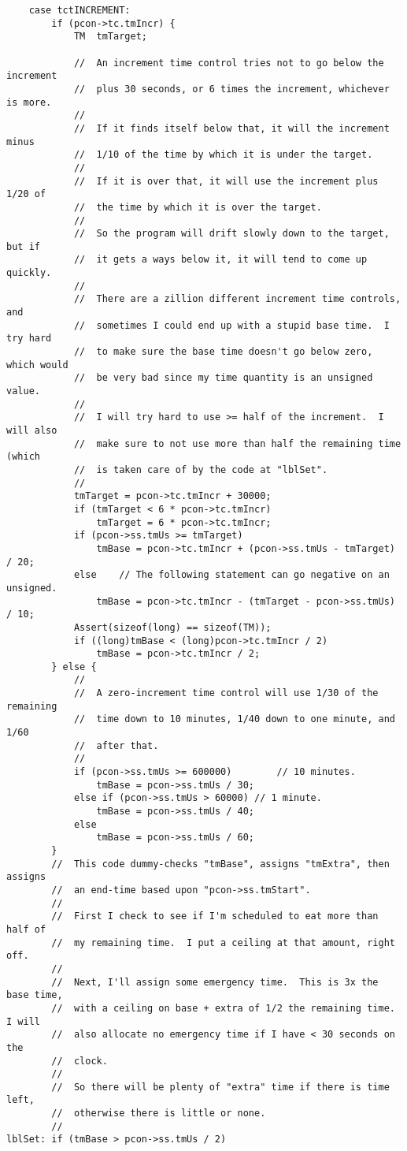 \documentclass[10pt,dvipdfmx]{report}
\begin{document}
\begin{verbatim}
	case tctINCREMENT:
		if (pcon->tc.tmIncr) {
			TM	tmTarget;

			//	An increment time control tries not to go below the increment
			//	plus 30 seconds, or 6 times the increment, whichever is more.
			//
			//	If it finds itself below that, it will the increment minus
			//	1/10 of the time by which it is under the target.
			//
			//	If it is over that, it will use the increment plus 1/20 of
			//	the time by which it is over the target.
			//
			//	So the program will drift slowly down to the target, but if
			//	it gets a ways below it, it will tend to come up quickly.
			//
			//	There are a zillion different increment time controls, and
			//	sometimes I could end up with a stupid base time.  I try hard
			//	to make sure the base time doesn't go below zero, which would
			//	be very bad since my time quantity is an unsigned value.
			//
			//	I will try hard to use >= half of the increment.  I will also
			//	make sure to not use more than half the remaining time (which
			//	is taken care of by the code at "lblSet".
			//
			tmTarget = pcon->tc.tmIncr + 30000;
			if (tmTarget < 6 * pcon->tc.tmIncr)
				tmTarget = 6 * pcon->tc.tmIncr;
			if (pcon->ss.tmUs >= tmTarget)
				tmBase = pcon->tc.tmIncr + (pcon->ss.tmUs - tmTarget) / 20;
			else	// The following statement can go negative on an unsigned.
				tmBase = pcon->tc.tmIncr - (tmTarget - pcon->ss.tmUs) / 10;
			Assert(sizeof(long) == sizeof(TM));
			if ((long)tmBase < (long)pcon->tc.tmIncr / 2)
				tmBase = pcon->tc.tmIncr / 2;
		} else {
			//
			//	A zero-increment time control will use 1/30 of the remaining
			//	time down to 10 minutes, 1/40 down to one minute, and 1/60
			//	after that.
			//
			if (pcon->ss.tmUs >= 600000)		// 10 minutes.
				tmBase = pcon->ss.tmUs / 30;
			else if (pcon->ss.tmUs > 60000)	// 1 minute.
				tmBase = pcon->ss.tmUs / 40;
			else
				tmBase = pcon->ss.tmUs / 60;
		}
		//	This code dummy-checks "tmBase", assigns "tmExtra", then assigns
		//	an end-time based upon "pcon->ss.tmStart".
		//
		//	First I check to see if I'm scheduled to eat more than half of
		//	my remaining time.  I put a ceiling at that amount, right off.
		//
		//	Next, I'll assign some emergency time.  This is 3x the base time,
		//	with a ceiling on base + extra of 1/2 the remaining time.  I will
		//	also allocate no emergency time if I have < 30 seconds on the
		//	clock.
		//
		//	So there will be plenty of "extra" time if there is time left,
		//	otherwise there is little or none.
		//
lblSet:	if (tmBase > pcon->ss.tmUs / 2)

\end{verbatim}
\end{document}
